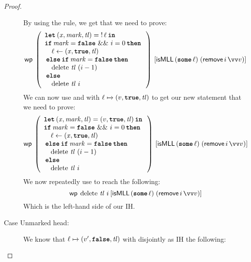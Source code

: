 \documentclass[thesis.tex]{subfiles}
\begin{document}
\begin{proof}
\begin{description}
      By using the  rule, we get that we need to prove:
      \[\wpre{
          \left(
          \begin{array}{l}
              \Let (\lvar, \langv{mark}, \langv{tl}) = \deref \loc in \\
              \If \langv{mark} = \False\ \&\&\ \iindex = 0 then       \\
              \quad \loc \gets (\lvar, \True, \langv{tl})             \\
              \Else \If \langv{mark} = \False then                    \\
              \quad \MLLdelete\,\langv{tl}\ (\iindex - 1)             \\
              \Else                                                   \\
              \quad \MLLdelete\,\langv{tl}\ \iindex
            \end{array}
          \right)
        }{\isMLL\, (\Some \loc)\; (\textlog{remove}\, \iindex\, \vect{v})}\]
      We can now use  and  with $\loc \fmapsto (\val, \True, \langv{tl})$ to get our new statement that we need to prove:
      \[
        \wpre{\left(
          \begin{array}{l}
              \Let (\lvar, \langv{mark}, \langv{tl}) = (\val, \True, \langv{tl}) in \\
              \If \langv{mark} = \False\ \&\&\ \iindex = 0 then                     \\
              \quad \loc \gets (\lvar, \True, \langv{tl})                           \\
              \Else \If \langv{mark} = \False then                                  \\
              \quad \MLLdelete\,\langv{tl}\ (\iindex - 1)                           \\
              \Else                                                                 \\
              \quad \MLLdelete\,\langv{tl}\ \iindex
            \end{array}
          \right)}{\isMLL\, (\Some \loc)\; (\textlog{remove}\, \iindex\, \vect{v})}
      \]
      We now repeatedly use  to reach the following:
      \[
        \wpre{\MLLdelete\,\langv{tl}\ \iindex}{\isMLL\, (\Some \loc)\; (\textlog{remove}\, \iindex\, \vect{\val})}
      \]
      Which is the left-hand side of our IH.
    \item[Case Unmarked head:] We know that $\loc \fmapsto (\val', \False, \langv{tl})$ with disjointly as IH the following:

\end{description}
\end{proof}
\end{document}
